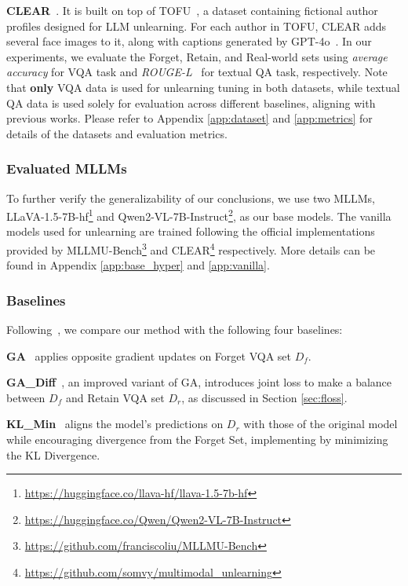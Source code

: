 \textbf{CLEAR}~\cite{dontsov2024clear}. It is built on top of TOFU~\cite{maini2024tofu}, a dataset containing fictional author profiles designed for LLM unlearning. For each author in TOFU, CLEAR adds several face images to it, along with captions generated by GPT-4o~\cite{OpenAI2023GPT4TR}. In our experiments, we evaluate the Forget, Retain, and Real-world sets using \textit{average accuracy} for VQA task and \textit{ROUGE-L}~\cite{Lin2004ROUGEAP} for textual QA task, respectively. Note that \textbf{only} VQA data is used for unlearning tuning in both datasets, while textual QA data is used solely for evaluation across different baselines, aligning with previous works. Please refer to Appendix \ref{app:dataset} and \ref{app:metrics} for details of the datasets and evaluation metrics.\par

\subsubsection{Evaluated MLLMs}
To further verify the generalizability of our conclusions, we use two MLLMs, LLaVA-1.5-7B-hf\footnote{\url{https://huggingface.co/llava-hf/llava-1.5-7b-hf}} and Qwen2-VL-7B-Instruct\footnote{\url{https://huggingface.co/Qwen/Qwen2-VL-7B-Instruct}}, as our base models. The vanilla models used for unlearning are trained following the official implementations provided by MLLMU-Bench\footnote{\url{https://github.com/franciscoliu/MLLMU-Bench}} and CLEAR\footnote{\url{https://github.com/somvy/multimodal_unlearning}} respectively. More details can be found in Appendix \ref{app:base_hyper} and \ref{app:vanilla}.

\subsubsection{Baselines}
Following~\citet{liu2024mllmubench}, we compare our method with the following four baselines: 

\textbf{GA}~\cite{thudi2022GA} applies opposite gradient updates on Forget VQA set $D_f$. 

\textbf{GA\_Diff}~\cite{liu2022GA_Diff}, an improved variant of GA, introduces joint loss to make a balance between $D_f$ and Retain VQA set $D_r$, as discussed in Section \ref{sec:floss}. 

\textbf{KL\_Min}~\cite{maini2024tofu} aligns the model’s predictions on $D_r$ with those of the original model while encouraging divergence from the Forget Set, implementing by minimizing the KL Divergence. 

